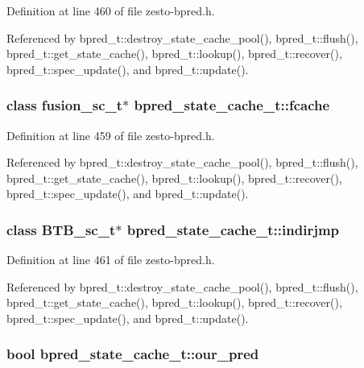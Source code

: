 Definition at line 460 of file zesto-bpred.h.

Referenced by bpred\_\-t::destroy\_\-state\_\-cache\_\-pool(), bpred\_\-t::flush(), bpred\_\-t::get\_\-state\_\-cache(), bpred\_\-t::lookup(), bpred\_\-t::recover(), bpred\_\-t::spec\_\-update(), and bpred\_\-t::update().
\subsubsection[{fcache}]{\setlength{\rightskip}{0pt plus 5cm}class {\bf fusion\_\-sc\_\-t}$\ast$ {\bf bpred\_\-state\_\-cache\_\-t::fcache}\hspace{0.3cm}{\tt  [protected]}}\label{classbpred__state__cache__t_16db1caa3444899168c8386f6e41a9cd}




Definition at line 459 of file zesto-bpred.h.

Referenced by bpred\_\-t::destroy\_\-state\_\-cache\_\-pool(), bpred\_\-t::flush(), bpred\_\-t::get\_\-state\_\-cache(), bpred\_\-t::lookup(), bpred\_\-t::recover(), bpred\_\-t::spec\_\-update(), and bpred\_\-t::update().
\subsubsection[{indirjmp}]{\setlength{\rightskip}{0pt plus 5cm}class {\bf BTB\_\-sc\_\-t}$\ast$ {\bf bpred\_\-state\_\-cache\_\-t::indirjmp}\hspace{0.3cm}{\tt  [protected]}}\label{classbpred__state__cache__t_b8fd131a650115451a1c8e5cbf77614b}




Definition at line 461 of file zesto-bpred.h.

Referenced by bpred\_\-t::destroy\_\-state\_\-cache\_\-pool(), bpred\_\-t::flush(), bpred\_\-t::get\_\-state\_\-cache(), bpred\_\-t::lookup(), bpred\_\-t::recover(), bpred\_\-t::spec\_\-update(), and bpred\_\-t::update().
\subsubsection[{our\_\-pred}]{\setlength{\rightskip}{0pt plus 5cm}bool {\bf bpred\_\-state\_\-cache\_\-t::our\_\-pred}}\label{classbpred__state__cache__t_6ae3589b3c282461078dc80d4f9935db}




